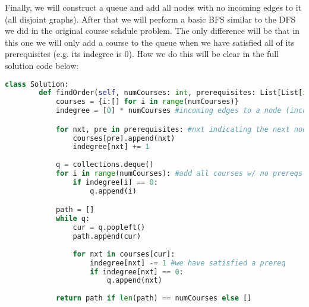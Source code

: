 \documentclass{article}
\begin{document}
\begin{flushleft}
    Finally, we will construct a queue and add all nodes with no incoming edges to it (all disjoint graphs). After that we will
    perform a basic BFS similar to the DFS we did in the original course schdule problem. The only difference will be that in this one
    we will only add a course to the queue when we have satisfied all of its prerequisites (e.g. its indegree is 0). How we do this
    will be clear in the full solution code below:
    \begin{lstlisting}[language=python]
    class Solution:
        def findOrder(self, numCourses: int, prerequisites: List[List[int]]):
            courses = {i:[] for i in range(numCourses)}
            indegree = [0] * numCourses #incoming edges to a node (incoming degree)

            for nxt, pre in prerequisites: #nxt indicating the next node
                courses[pre].append(nxt)
                indegree[nxt] += 1
            
            q = collections.deque()
            for i in range(numCourses): #add all courses w/ no prereqs
                if indegree[i] == 0:
                    q.append(i)

            path = []
            while q:
                cur = q.popleft()
                path.append(cur)
                
                for nxt in courses[cur]:
                    indegree[nxt] -= 1 #we have satisfied a prereq
                    if indegree[nxt] == 0:
                        q.append(nxt)        
            
            return path if len(path) == numCourses else []
    \end{lstlisting}
\end{flushleft}
\end{document}
